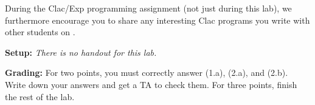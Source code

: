 \documentclass[lab]{inc/122handout}
\begin{document}
\labcollab

During the Clac/Exp programming assignment (not just during this lab),
we furthermore encourage you to share any interesting Clac programs
you write with other students on \qatool{}.

\textbf{Setup:} \emph{There is no handout for this lab.}

\textbf{Grading:} For two points, you must correctly answer (1.a), (2.a), and
(2.b). Write down your answers and get a TA to check them. For three points,
finish the rest of the lab.

\end{document}
